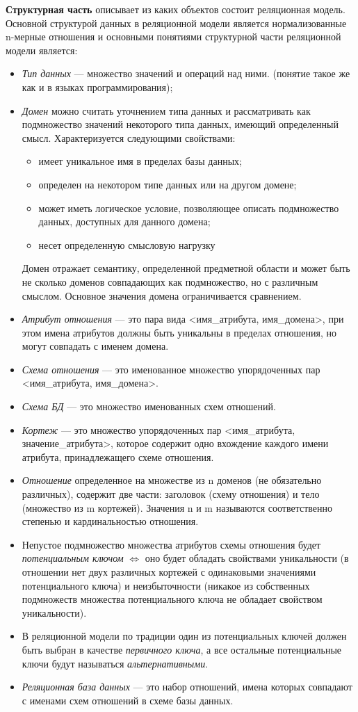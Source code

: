 \textbf{Структурная часть} описывает из каких объектов состоит реляционная модель. Основной структурой данных в реляционной модели является нормализованные n-мерные отношения и основными понятиями структурной части реляционной модели является:
\begin{itemize}
	\item \textit{Тип данных} --- множество значений и операций над ними. (понятие такое же как и в языках программирования);
	\item \textit{Домен} можно считать уточнением типа данных и рассматривать как подмножество значений некоторого типа данных, имеющий определенный смысл. 
	Характеризуется следующими свойствами:
	\begin{itemize}
		\item имеет уникальное имя в пределах базы данных;
		\item определен на некотором типе данных или на другом домене;
		\item может иметь логическое условие, позволяющее описать подмножество данных, доступных для данного домена;
		\item несет определенную смысловую нагрузку
	\end{itemize}
	Домен отражает семантику, определенной предметной области и может быть не сколько доменов совпадающих как подмножество, но с различным смыслом. Основное значения домена ограничивается сравнением.
	\item \textit{Атрибут отношения} --- это пара вида <имя\_атрибута, имя\_домена>, при этом имена атрибутов должны быть уникальны в пределах отношения, но могут совпадать с именем домена.
	\item \textit{Схема отношения} --- это именованное множество упорядоченных пар <имя\_атрибута, имя\_домена>.
	\item \textit{Схема БД} --- это множество именованных схем отношений.
	\item \textit{Кортеж} --- это множество упорядоченных пар <имя\_атрибута, значение\_атрибута>, которое содержит одно вхождение каждого имени атрибута, принадлежащего схеме отношения.
	\item \textit{Отношение} определенное на множестве из n доменов (не обязательно различных), содержит две части: заголовок (схему отношения) и тело (множество из m кортежей). Значения n и m называются соответственно степенью и кардинальностью отношения.
	\item Непустое подмножество множества атрибутов схемы отношения будет \textit{потенциальным ключом} $\Leftrightarrow$ оно будет обладать свойствами уникальности (в отношении нет двух различных кортежей с одинаковыми 
	значениями потенциального ключа) и неизбыточности (никакое из собственных подмножеств множества 
	потенциального ключа не обладает свойством уникальности). 
	\item В реляционной модели по традиции один из потенциальных ключей должен быть выбран в качестве \textit{первичного ключа}, а все остальные потенциальные ключи будут называться \textit{альтернативными}.
	\item \textit{Реляционная база данных} --- это набор отношений, имена которых совпадают с именами схем отношений в схеме базы данных.
\end{itemize}


